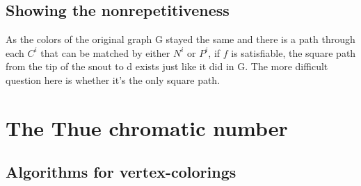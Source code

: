 \documentclass[12pt,a4paper]{article}
\begin{document}
\subsection{Showing the nonrepetitiveness}

As the colors of the original graph G stayed the same and there is a path through each $C^i$ that can be matched by either $N^i$ or $P^i$, if $f$ is satisfiable, the square path from the tip of the snout to d exists just like it did in G. The more difficult question here is whether it's the only square path.

\newpage	
\section{The Thue chromatic number}
\subsection{Algorithms for vertex-colorings}
\end{document}
